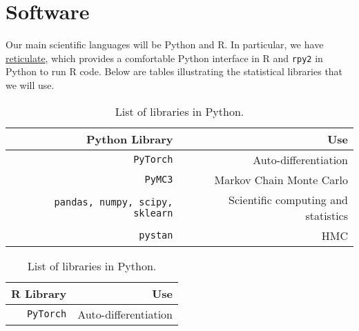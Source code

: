 \documentclass[12pt]{article}
\theoremstyle{definition}
\theoremstyle{remark}
\theoremstyle{definition}
\theoremstyle{plain}
\begin{document}
\section{Software}
Our main scientific languages will be Python and R. In particular, we have \href{https://blog.rstudio.com/2018/03/26/reticulate-r-interface-to-python/}{reticulate}, which provides a comfortable Python interface in R and \verb+rpy2+ in Python to run R code. Below are tables illustrating the statistical libraries that we will use.
\begin{table}[H]
\centering
\begin{tabular}{rr}
  \hline
Python Library & Use  \\ 
 \hline
\verb+PyTorch+ & Auto-differentiation  \\ 
\verb+PyMC3+ & Markov Chain Monte Carlo \\ 
\verb+pandas, numpy, scipy, sklearn+ & Scientific computing and statistics \\ 
\verb+pystan+ &  HMC\\ 
   \hline
\end{tabular}
\caption{List of libraries in Python.} 
\label{Table6.1}
\end{table}

\begin{table}[H]
\centering
\begin{tabular}{rr}
  \hline
R Library & Use  \\ 
 \hline
\verb+PyTorch+ & Auto-differentiation  \\ 
   \hline
\end{tabular}
\caption{List of libraries in Python.} 
\label{Table6.2}
\end{table}


\newpage


\end{document}
